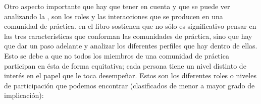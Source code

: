 Otro aspecto importante que hay que tener en cuenta y que se puede ver analizando la , son los roles y las interacciones que se producen en una comunidad de práctica. \citeauthor{libro:comunidades-de-practica-wenger} en el libro  \cite{libro:comunidades-de-practica-wenger} sostienen que no sólo es significativo pensar en las tres características que conforman las comunidades de práctica, sino que hay que dar un paso adelante y analizar los diferentes perfiles que hay dentro de ellas. Esto se debe a que no todos los miembros de una comunidad de práctica participan en ésta de forma equitativa; cada persona tiene un nivel distinto de interés en el papel que le toca desempeñar. Estos son los diferentes roles o niveles de participación que podemos encontrar (clasificados de menor a mayor grado de implicación):


